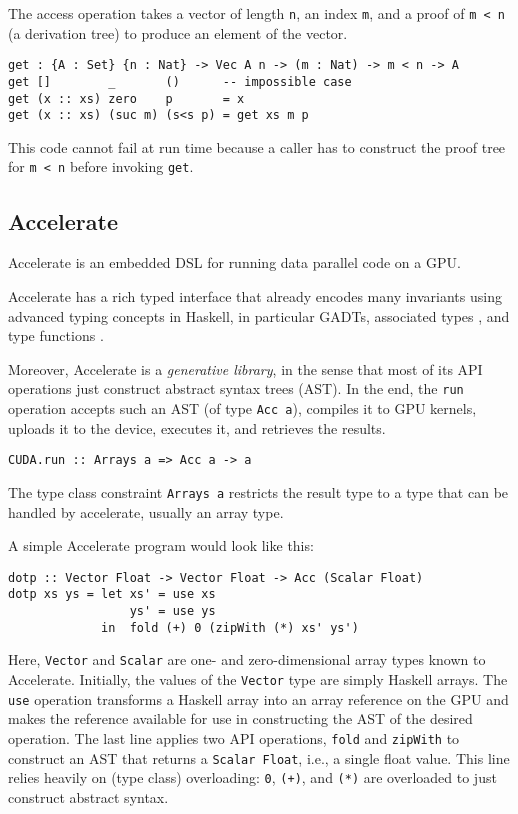 \documentclass{llncs}
\begin{document}
The access operation takes a vector of length \verb+n+, an index
\verb+m+, and a proof of \verb+m < n+ (a derivation tree) to produce
an element of the vector.  
\begin{verbatim}
get : {A : Set} {n : Nat} -> Vec A n -> (m : Nat) -> m < n -> A
get []        _       ()      -- impossible case
get (x :: xs) zero    p       = x
get (x :: xs) (suc m) (s<s p) = get xs m p
\end{verbatim}
This code cannot fail at run time because a caller has to
construct the proof tree for \verb+m < n+ before invoking \verb+get+.

\subsection{Accelerate}
\label{sec:accelerate}

Accelerate \cite{ChakravartyKellerLeeMcdonellGrover2011} is an
embedded DSL for running data parallel code on a GPU. 

Accelerate has a rich typed interface that already encodes many
invariants using advanced typing concepts in Haskell, in particular
GADTs\cite{PeytonJonesVytiniotisWeirichWashburn2006}, associated types
\cite{ChakravartyKellerJones2005}, and type functions
\cite{SchrijversPeytonJonesChakravartySulzmann2008}. 

Moreover, Accelerate is a \emph{generative library}, in the sense that
most of its API operations just construct abstract syntax trees (AST). In the end,
the \verb+run+ operation accepts such an AST (of type \verb+Acc a+),
compiles it to GPU kernels, 
uploads it to the device, executes it, and retrieves the results. 
\begin{verbatim}
CUDA.run :: Arrays a => Acc a -> a
\end{verbatim}
The type class constraint \verb+Arrays a+ restricts the result type to
a type that can be handled by accelerate, usually an array type.

A simple Accelerate program would look like this:
\begin{verbatim}
dotp :: Vector Float -> Vector Float -> Acc (Scalar Float)
dotp xs ys = let xs' = use xs
                 ys' = use ys
             in  fold (+) 0 (zipWith (*) xs' ys')
\end{verbatim}
Here, \verb+Vector+ and \verb+Scalar+ are one- and zero-dimensional
array types known to Accelerate. Initially, the values of the
\verb+Vector+ type are simply Haskell arrays. The \verb+use+ operation
transforms a Haskell array into an array reference on the GPU and
makes the reference available for use in constructing the AST of the
desired operation. The last line applies two API operations,
\texttt{fold} and \texttt{zipWith} to construct an AST that returns a
\texttt{Scalar Float}, i.e., a single float value. This line relies
heavily on (type class) overloading: \texttt{0}, \texttt{(+)}, and
\texttt{(*)} are overloaded to just construct abstract syntax. 
\end{document}
